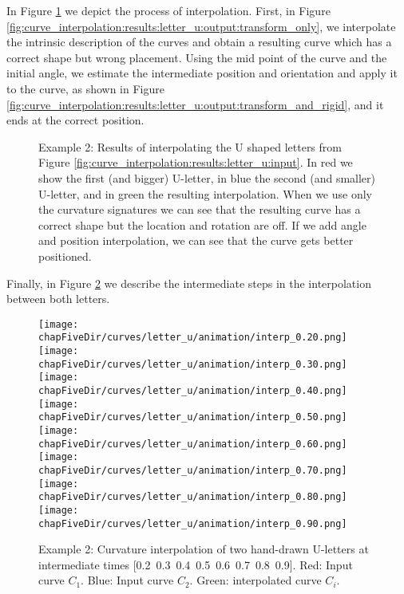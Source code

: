 \documentclass{ipol}
\newcommand{\chapFiveDir}{images/chapter_05a}
\renewcommand{\anchocuatro}{3.2cm}
\begin{document}
In Figure \ref{fig:curve_interpolation:results:letter_u:output} we depict the process of interpolation. First, in Figure \ref{fig:curve_interpolation:results:letter_u:output:transform_only}, we interpolate the intrinsic description of the curves and obtain a resulting curve which has a correct shape but wrong placement. Using the mid point of the curve and the initial angle, we estimate the intermediate position and orientation and apply it to the curve, as shown in Figure \ref{fig:curve_interpolation:results:letter_u:output:transform_and_rigid}, and it ends at the correct position.

\begin{figure}[h]
	\centering
	\caption{
		Example 2: Results of interpolating the U shaped letters from Figure \ref{fig:curve_interpolation:results:letter_u:input}. In red we show the first (and bigger) U-letter, in blue the second (and smaller) U-letter, and in green the resulting interpolation.
		\protect{} When we use only the curvature signatures we can see that the resulting curve has a correct shape but the location and rotation are off.
		\protect{} If we add angle and position interpolation, we can see that the curve gets better positioned.
	}
	\label{fig:curve_interpolation:results:letter_u:output}
\end{figure}	

Finally, in Figure \ref{fig:curve_interpolation:results:letter_u:animation} we describe the intermediate steps in the interpolation between both letters.

\begin{figure}[h]
	\centering
	\texttt{[image: \\chapFiveDir/curves/letter\_u/animation/interp\_0.20.png]}
	\texttt{[image: \\chapFiveDir/curves/letter\_u/animation/interp\_0.30.png]}
	\texttt{[image: \\chapFiveDir/curves/letter\_u/animation/interp\_0.40.png]}
	\texttt{[image: \\chapFiveDir/curves/letter\_u/animation/interp\_0.50.png]}\\
	\texttt{[image: \\chapFiveDir/curves/letter\_u/animation/interp\_0.60.png]}
	\texttt{[image: \\chapFiveDir/curves/letter\_u/animation/interp\_0.70.png]}
	\texttt{[image: \\chapFiveDir/curves/letter\_u/animation/interp\_0.80.png]}
	\texttt{[image: \\chapFiveDir/curves/letter\_u/animation/interp\_0.90.png]}
	\caption{Example 2: Curvature interpolation of two hand-drawn U-letters at intermediate times \mbox{[0.2 0.3 0.4 0.5 0.6 0.7 0.8 0.9]}. Red: Input curve $C_1$. Blue: Input curve $C_2$. Green: interpolated curve $C_i$. }
	\label{fig:curve_interpolation:results:letter_u:animation}
\end{figure}	
\end{document}
